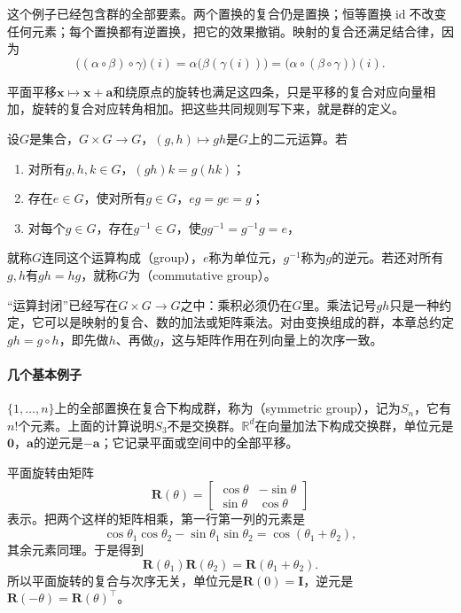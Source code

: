 这个例子已经包含群的全部要素。两个置换的复合仍是置换；恒等置换$\operatorname{id}$不改变任何元素；每个置换都有逆置换，把它的效果撤销。映射的复合还满足结合律，因为
\[
\bigl((\alpha\circ\beta)\circ\gamma\bigr)(i)
=\alpha\bigl(\beta(\gamma(i))\bigr)
=\bigl(\alpha\circ(\beta\circ\gamma)\bigr)(i).
\]

平面平移$\bm x\mapsto\bm x+\bm a$和绕原点的旋转也满足这四条，只是平移的复合对应向量相加，旋转的复合对应转角相加。把这些共同规则写下来，就是群的定义。

\begin{definition}[群]
\label{def:lie-group}
设$G$是集合，$G\times G\to G$，$(g,h)\mapsto gh$是$G$上的二元运算。若
\begin{enumerate}
 \item 对所有$g,h,k\in G$，$(gh)k=g(hk)$；
 \item 存在$e\in G$，使对所有$g\in G$，$eg=ge=g$；
 \item 对每个$g\in G$，存在$g^{-1}\in G$，使$gg^{-1}=g^{-1}g=e$，
\end{enumerate}
就称$G$连同这个运算构成（group），$e$称为单位元，$g^{-1}$称为$g$的逆元。若还对所有$g,h$有$gh=hg$，就称$G$为（commutative group）。
\end{definition}

“运算封闭”已经写在$G\times G\to G$之中：乘积必须仍在$G$里。乘法记号$gh$只是一种约定，它可以是映射的复合、数的加法或矩阵乘法。对由变换组成的群，本章总约定$gh=g\circ h$，即先做$h$、再做$g$，这与矩阵作用在列向量上的次序一致。

\paragraph{几个基本例子}
$\{1,\ldots,n\}$上的全部置换在复合下构成群，称为（symmetric group），记为$S_n$，它有$n!$个元素。上面的计算说明$S_3$不是交换群。$\mathbb R^d$在向量加法下构成交换群，单位元是$\bm0$，$\bm a$的逆元是$-\bm a$；它记录平面或空间中的全部平移。

平面旋转由矩阵
\begin{equation}
 \bm R(\theta)=\begin{bmatrix}\cos\theta&-\sin\theta\\\sin\theta&\cos\theta\end{bmatrix}
 \label{eq:lie-planar-rotation}
\end{equation}
表示。把两个这样的矩阵相乘，第一行第一列的元素是
\[
\cos\theta_1\cos\theta_2-\sin\theta_1\sin\theta_2=\cos(\theta_1+\theta_2),
\]
其余元素同理。于是得到
\[
\bm R(\theta_1)\bm R(\theta_2)=\bm R(\theta_1+\theta_2).
\]
所以平面旋转的复合与次序无关，单位元是$\bm R(0)=\bm I$，逆元是$\bm R(-\theta)=\bm R(\theta)^\top$。

